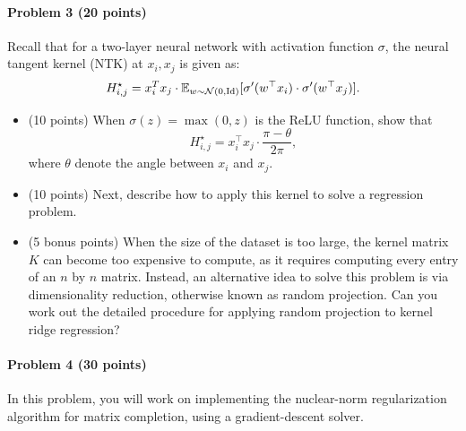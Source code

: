 \documentclass[11pt]{article}
\begin{document}
\newpage
\paragraph{Problem 3 (20 points)}
Recall that for a two-layer neural network with activation function $\sigma$, the neural tangent kernel (NTK) at $x_i, x_j$ is given as:
\[ H_{i,j}^\star = x_i^Tx_j\cdot \mathbb{E}_{w\sim \mathcal{N}(0, \operatorname{Id})}[\sigma'(w^{\top} x_i)\cdot\sigma'(w^{\top} x_j)]. \]
\begin{itemize}
    \item (10 points) When $\sigma(z) = \max (0,z)$ is the ReLU function, show that
    \[ H_{i,j}^\star = x_i^{\top} x_j\cdot \frac{\pi - \theta}{2\pi}, \]
    where $\theta$ denote the angle between $x_i$ and $x_j$.

    \item (10 points) Next, describe how to apply this kernel to solve a regression problem.

    \item (5 bonus points) When the size of the dataset is too large, the kernel matrix $K$ can become too expensive to compute, as it requires computing every entry of an $n$ by $n$ matrix. Instead, an alternative idea to solve this problem is via dimensionality reduction, otherwise known as random projection. Can you work out the detailed procedure for applying random projection to kernel ridge regression?
\end{itemize}

\newpage
\paragraph{Problem 4 (30 points)}
In this problem, you will work on implementing the nuclear-norm regularization algorithm for matrix completion, using a gradient-descent solver.
\end{document}
